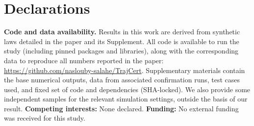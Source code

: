 \section*{Declarations} 
\noindent\textbf{Code and data availability.} Results in this work are derived from synthetic laws detailed in the paper and its Supplement. All code is available to run the study (including pinned packages and libraries), along with the corresponding data to reproduce all numbers reported in the paper: \url{https://github.com/naslouby-salahe/TrajCert}. Supplementary materials contain the base numerical outputs, data from associated confirmation runs, test cases used, and fixed set of code and dependencies (SHA-locked). We also provide some independent samples for the relevant simulation settings, outside the basis of our result. \textbf{Competing interests: } None declared. \textbf{Funding:} No external funding was received for this study.
